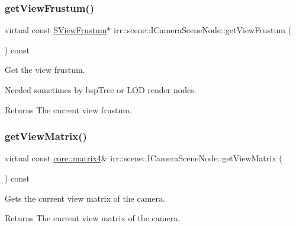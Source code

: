 \subsubsection{\texorpdfstring{get\+View\+Frustum()}{getViewFrustum()}\hspace{0.1cm}{\footnotesize\ttfamily [2/2]}}
{\footnotesize\ttfamily virtual const \hyperlink{structirr_1_1scene_1_1SViewFrustum}{S\+View\+Frustum}$\ast$ irr\+::scene\+::\+I\+Camera\+Scene\+Node\+::get\+View\+Frustum (\begin{DoxyParamCaption}{ }\end{DoxyParamCaption}) const\hspace{0.3cm}{\ttfamily [pure virtual]}}



Get the view frustum. 

Needed sometimes by bsp\+Tree or L\+OD render nodes. \begin{DoxyReturn}{Returns}
The current view frustum. 
\end{DoxyReturn}
\mbox{\label{classirr_1_1scene_1_1ICameraSceneNode_aef40bb2f8f4a95a66dbb7fc3abee3e49}} 
\subsubsection{\texorpdfstring{get\+View\+Matrix()}{getViewMatrix()}\hspace{0.1cm}{\footnotesize\ttfamily [1/2]}}
{\footnotesize\ttfamily virtual const \hyperlink{namespaceirr_1_1core_a4c9d4e29899535971052810954a14431}{core\+::matrix4}\& irr\+::scene\+::\+I\+Camera\+Scene\+Node\+::get\+View\+Matrix (\begin{DoxyParamCaption}{ }\end{DoxyParamCaption}) const\hspace{0.3cm}{\ttfamily [pure virtual]}}



Gets the current view matrix of the camera. 

\begin{DoxyReturn}{Returns}
The current view matrix of the camera. 
\end{DoxyReturn}
\mbox{\label{classirr_1_1scene_1_1ICameraSceneNode_aef40bb2f8f4a95a66dbb7fc3abee3e49}} 
